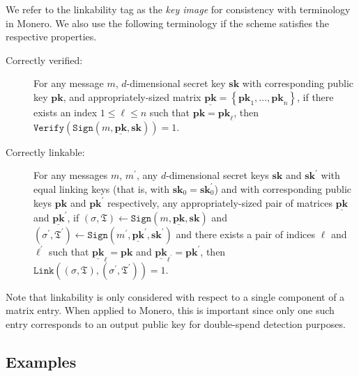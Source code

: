 \documentclass{article}
\theoremstyle{plain}
\theoremstyle{definition}
\begin{document}
We refer to the linkability tag as the \textit{key image} for consistency with terminology in Monero. We also use the following terminology if the scheme satisfies the respective properties.
\begin{description}
\item[Correctly verified:] For any message $m$, $d$-dimensional secret key $\textbf{sk}$ with corresponding public key $\textbf{pk}$, and appropriately-sized matrix $\underline{\textbf{pk}} = \left\{\textbf{pk}_1, \ldots, \textbf{pk}_n\right\}$, if there exists an index $1 \leq \ell \leq n$ such that $\textbf{pk} = \textbf{pk}_\ell$, then $\texttt{Verify}(\texttt{Sign}(m, \underline{\textbf{pk}}, \textbf{sk})) = 1$.

\item[Correctly linkable:] For any messages $m$, $m^\prime$, any $d$-dimensional secret keys  $\textbf{sk}$ and $\textbf{sk}^\prime$ with equal linking keys (that is, with $\textbf{sk}_0 = \textbf{sk}^\prime_0$) and with corresponding public keys $\textbf{pk}$ and $\textbf{pk}^\prime$ respectively, any appropriately-sized pair of matrices $\underline{\textbf{pk}}$ and $\underline{\textbf{pk}}^\prime$, if $(\sigma, \mathfrak{T}) \leftarrow \texttt{Sign}(m, \underline{\textbf{pk}}, \textbf{sk})$ and $(\sigma^\prime, \mathfrak{T}^\prime) \leftarrow \texttt{Sign}(m^\prime, \underline{\textbf{pk}}^\prime, \textbf{sk}^\prime)$ and there exists a pair of indices $\ell$ and $\ell^\prime$ such that $\underline{\textbf{pk}}_\ell = \textbf{pk}$ and $\underline{\textbf{pk}}_{\ell^\prime} = \textbf{pk}^\prime$, then
$\texttt{Link}((\sigma, \mathfrak{T}), (\sigma^\prime, \mathfrak{T}^\prime))=1$.
\end{description}

Note that linkability is only considered with respect to a single component of a matrix entry. When applied to Monero, this is important since only one such entry corresponds to an output public key for double-spend detection purposes.



\subsection{Examples}
\end{document}

